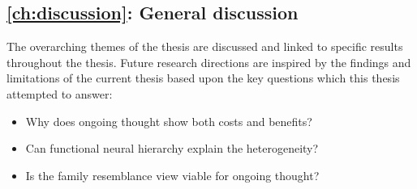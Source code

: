 \subsection*{\cref{ch:discussion}: General discussion}
The overarching themes of the thesis are discussed and linked to specific results throughout the thesis. Future research directions are inspired by the findings and limitations of the current thesis based upon the key questions which this thesis attempted to answer:

\begin{itemize}
    \item Why does ongoing thought show both costs and benefits? 
    \item Can functional neural hierarchy explain the heterogeneity?
    \item Is the family resemblance view viable for ongoing thought?
\end{itemize}


